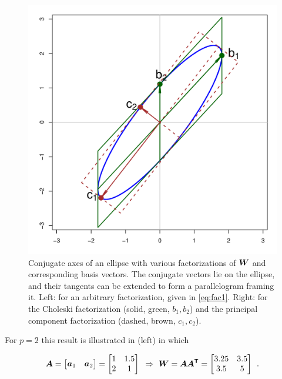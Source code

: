 \begin{figure}[htb]
\begin{minipage}[b]{.49\linewidth}
  \includegraphics[width=1\linewidth]{fig/conjugate2}
 \end{minipage}
\caption{Conjugate axes of an ellipse with various factorizations of $\bm{W}$ and corresponding
basis vectors.
The conjugate vectors lie on the ellipse, and their tangents can be extended to form a parallelogram framing it.
Left: for an arbitrary factorization, given in \eqref{eq:fac1}.
Right: for the Choleski factorization (solid, green, $b_1, b_2$) and the principal component factorization (dashed, brown, $c_1, c_2$).
}
\label{fig:conjugate}
\end{figure}
For
$p=2$
this result is illustrated in  (left)
in which

\begin{equation}\label{eq:fac1}
\bm{A}=\left[ \begin{matrix}
   \bm{a}_{1} & \bm{a}_{2}  \\
\end{matrix} \right]=\left[
\begin{matrix}
   1 & 1.5  \\
   2 & 1  \\
\end{matrix} \right]
\mbox{   }\Rightarrow\mbox{   }
\bm{W}=\bm{A A^\mathsf{T}}=
\left[ \begin{matrix}
   3.25 & 3.5  \\
   3.5 & 5  \\
\end{matrix} \right]
\:\: .
\end{equation}

